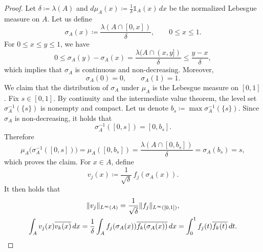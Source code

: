 \documentclass[reqno,a4paper,12pt]{amsart}
\numberwithin{equation}{section}
\newcommand\1{\mathds{1}}
\begin{document}
\begin{proof}
    Let $\delta\coloneqq \lambda(A)$ and $d\mu_A(x)
    \coloneqq
    \frac{1}{\delta}\mathds 1_A(x)\,dx$
    be the normalized Lebesgue measure on $A$. Let us define
    \begin{equation*}
    \sigma_A(x)
    \coloneqq
    \frac{\lambda(A\cap[0,x])}{\delta},
    \qquad 0\le x\le1.
    \end{equation*}
    For $0\le x\le y\le1$, we have
    \begin{equation*}
    0\le \sigma_A(y)-\sigma_A(x)
    =
    \frac{\lambda(A\cap(x,y])}{\delta}
    \le \frac{y-x}{\delta},
    \end{equation*}
    which implies that $\sigma_A$ is continuous and non-decreasing. Moreover,
    \begin{equation*}
    \sigma_A(0)=0,
    \qquad
    \sigma_A(1)=1.
    \end{equation*}
    We claim that the distribution of $\sigma_A$ under $\mu_A$ is the Lebesgue measure on $[0,1]$. Fix $s\in[0,1]$. By continuity and the
    intermediate value theorem, the level set $\sigma_A^{-1}(\{s\})$ is nonempty and compact. Let us denote $b_s\coloneqq\max\sigma_A^{-1}(\{s\})$. Since $\sigma_A$ is non-decreasing, it holds that
    \begin{equation*}
    \sigma_A^{-1}([0,s])=[0,b_s].
    \end{equation*}
    Therefore
    \begin{equation*}
    \mu_A\bigl(\sigma_A^{-1}([0,s])\bigr)
    =
    \mu_A([0,b_s])
    =
    \frac{\lambda(A\cap[0,b_s])}{\delta}
    =
    \sigma_A(b_s)
    =
    s,
    \end{equation*}
    which proves the claim. For $x\in A$, define
    \begin{equation*}
    v_j(x)
    \coloneqq
    \frac{1}{\sqrt{\delta}}\,
    f_j(\sigma_A(x)).
    \end{equation*}
    It then holds that
    \begin{gather*}
        \|v_j\|_{L^\infty(A)} = \frac{1}{\sqrt{\delta}}\|f_j\|_{L^\infty([0,1])},
        \\
        \int_A v_j(x)\overline{v_k(x)}\,dx
        =
        \frac{1}{\delta}
        \int_A
        f_j(\sigma_A(x))
        \overline{f_k(\sigma_A(x))}\,dx
        =
        \int_0^1 f_j(t)\overline{f_k(t)}\,dt.\qedhere
    \end{gather*}
\end{proof}
\end{document}
